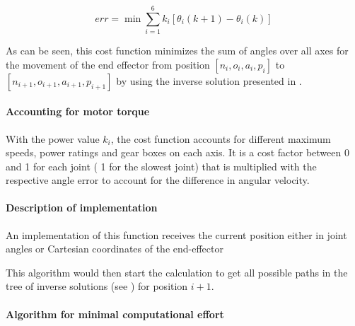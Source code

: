 \begin{equation}\label{eq:costFuncinvOptim}
	err =  \min\sum_{i=1}^{6} k_i [\theta_i (k+1) - \theta_i(k)] 
\end{equation}

As can be seen, this cost function minimizes the sum of angles over all axes for the movement of the end effector from position $[n_i,o_i,a_i,p_i ]$ to $[n_{i+1}, o_{i+1}, a_{i+1}, p_{i+1}]$ by using the inverse solution presented in .


\paragraph{Accounting for motor torque}
With the power value $k_i$, the cost function accounts for different maximum speeds, power ratings and gear boxes on each axis. It is a cost factor between 0 and 1 for each joint ( 1 for the slowest joint) that is multiplied with the respective angle error to account for the difference in angular velocity. 



\paragraph{Description of implementation}

An implementation of this function receives the current position either in joint angles or Cartesian coordinates of the end-effector %

This algorithm would then start the calculation to get all possible paths in the tree of inverse solutions (see ) for position ${i+1}$.

\paragraph{Algorithm for minimal computational effort}

